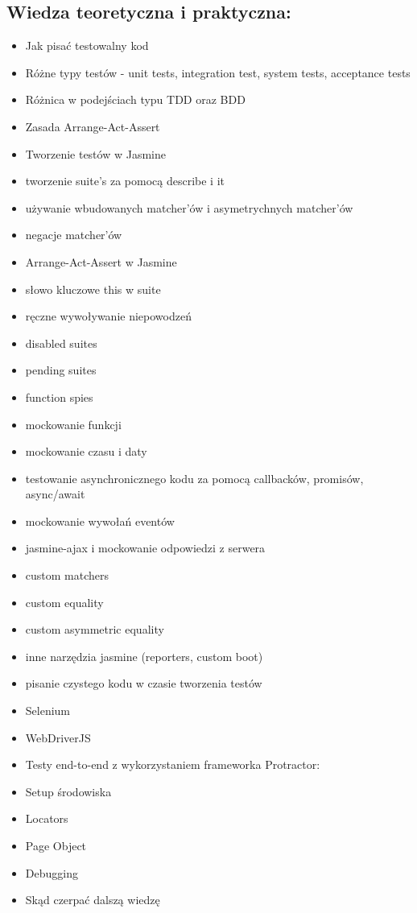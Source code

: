 \documentclass{article}[10pt]
\begin{document}
	\subsection*{Wiedza teoretyczna i praktyczna:}
\begin{adjustwidth}{1.5cm}{}
	\begin{itemize}
		\item Jak pisać testowalny kod
		\item Różne typy testów - unit tests, integration test, system tests, acceptance tests
		\item Różnica w podejściach typu TDD oraz BDD
		\item Zasada Arrange-Act-Assert
		\item Tworzenie testów w Jasmine
		\item tworzenie suite’s za pomocą describe i it
		\item używanie wbudowanych matcher’ów i asymetrychnych matcher’ów
		\item negacje matcher’ów
		\item Arrange-Act-Assert w Jasmine
		\item słowo kluczowe this w suite
		\item ręczne wywoływanie niepowodzeń
		\item disabled suites
		\item pending suites
		\item function spies
		\item mockowanie funkcji
		\item mockowanie czasu i daty
		\item testowanie asynchronicznego kodu za pomocą callbacków, promisów, async/await
		\item mockowanie wywołań eventów
		\item jasmine-ajax i mockowanie odpowiedzi z serwera
		\item custom matchers
		\item custom equality
		\item custom asymmetric equality
		\item inne narzędzia jasmine (reporters, custom boot)
		\item pisanie czystego kodu w czasie tworzenia testów
		\item Selenium
		\item WebDriverJS
		\item Testy end-to-end z wykorzystaniem frameworka Protractor:
		\item Setup środowiska
		\item Locators
		\item Page Object
		\item Debugging
		\item Skąd czerpać dalszą wiedzę
	\end{itemize}
\end{adjustwidth}
\end{document}
